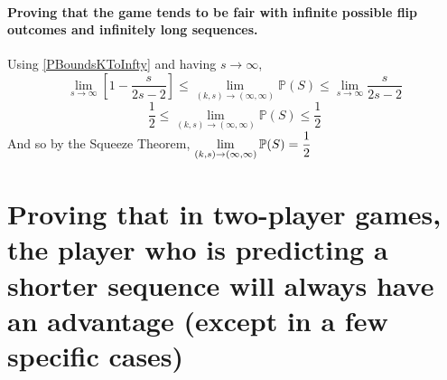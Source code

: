 \documentclass[english,12pt,a4paper,final]{article}
\begin{document}
\subsection{Proving that the game tends to be fair with infinite possible flip outcomes and infinitely long sequences.}
Using \eqref{PBoundsKToInfty} and having $s\rightarrow\infty$,
\begin{equation*}
	\lim_{s\rightarrow\infty}\left[1-\frac{s}{2s-2}\right] \le \lim_{(k, s)\rightarrow(\infty, \infty)} \mathbb{P}(S) \le \lim_{s\rightarrow\infty}\frac{s}{2s-2} 
\end{equation*}
\begin{equation*}
	\frac{1}{2} \le \lim_{(k, s)\rightarrow(\infty, \infty)} \mathbb{P}(S) \le \frac{1}{2}
\end{equation*}
And so by the Squeeze Theorem, $\mathlarger{\lim_{(k, s)\rightarrow(\infty, \infty)} \mathbb{P}(S) = \frac{1}{2}}$

\part{Proving that in two-player games, the player who is predicting a shorter sequence will always have an advantage (except in a few specific cases)}\label{shorterSequenceProof}
\end{document}
